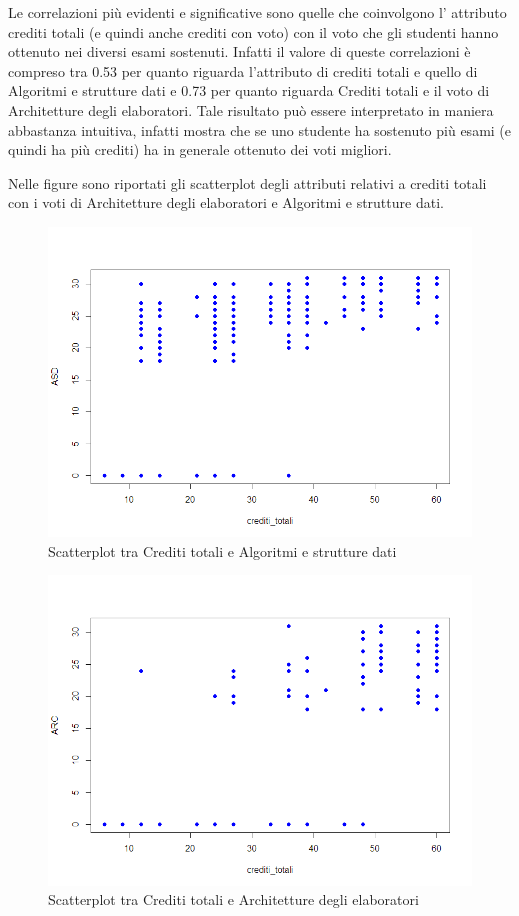 \documentclass[12pt]{article}
\begin{document}
Le correlazioni più evidenti e significative sono quelle che coinvolgono l' attributo crediti totali (e quindi anche crediti con voto) con il voto che gli studenti hanno ottenuto nei diversi esami sostenuti.
Infatti il valore di queste correlazioni è compreso tra 0.53 per quanto riguarda l'attributo di crediti totali e quello di Algoritmi e strutture dati e 0.73 per quanto riguarda Crediti totali e il voto di Architetture degli elaboratori.
Tale risultato può essere interpretato in maniera abbastanza intuitiva, infatti mostra che se uno studente ha sostenuto più esami (e quindi ha più crediti) ha in generale ottenuto dei voti migliori.

Nelle figure sono riportati gli scatterplot degli attributi relativi a crediti totali con i voti di Architetture degli elaboratori e Algoritmi e strutture dati.
\begin{figure}[H]
	\includegraphics[width=\textwidth]{img/creditiAsd.png}
	\caption{Scatterplot tra Crediti totali e Algoritmi e strutture dati}
\end{figure}

\begin{figure}[H]
	\includegraphics[width=\textwidth]{img/creditiArc.png}
	\caption{Scatterplot tra Crediti totali e Architetture degli elaboratori}
\end{figure}
\end{document}
